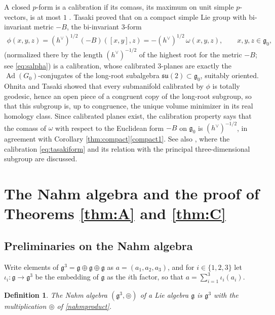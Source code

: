 \documentclass [leqno, 10pt]{amsart}
\newtheorem{definition}[theorem]{Definition}%
\theoremstyle{definition}
\numberwithin{equation}{section}
\newcommand{\tmlt}{\circledcirc}
\newcommand{\om}{\omega}
\newcommand{\su}{\mathfrak{su}}
\newcommand{\g}{\mathfrak{g}}
\newcommand{\Ad}{\operatorname{Ad}}
\newcommand{\gz}{\g_{0}}
\newcommand{\hv}{h^\vee}
\begin{document}
\begin{remark}\label{rem:calibration}
A closed $p$-form is a calibration if its comass, its maximum on unit simple $p$-vectors, is at most $1$ \cite{Harvey-Lawson}. Tasaki \cite[Theorem~5]{Tasaki-calibration} proved that on a compact simple Lie group with bi-invariant metric $-B$, the bi-invariant $3$-form 
\begin{align}\label{eq:tasakiform}
\phi(x, y, z) = (\hv)^{1/2}\,(-B)([x, y], z) = -(\hv)^{1/2}\,\om(x, y, z), \qquad x, y, z \in \gz,
\end{align}
(normalized there by the length $(\hv)^{-1/2}$ of the highest root for the metric $-B$; see \eqref{eq:salpha}) is a calibration, whose calibrated $3$-planes are exactly the $\Ad(G_{0})$-conjugates of the long-root subalgebra $\su(2) \subset \gz$, suitably oriented. Ohnita and Tasaki \cite[Theorem~2 and Lemma~5]{Ohnita-Tasaki} showed that every submanifold calibrated by $\phi$ is totally geodesic, hence an open piece of a congruent copy of the long-root subgroup, so that this subgroup is, up to congruence, the unique volume minimizer in its real homology class. Since calibrated planes exist, the calibration property says that the comass of $\om$ with respect to the Euclidean form $-B$ on $\gz$ is $(\hv)^{-1/2}$, in agreement with Corollary \ref{thm:compact}\ref{compact1}. See also \cite{Hitchin-calibrations}, where the calibration \eqref{eq:tasakiform} and its relation with the principal three-dimensional subgroup are discussed.
\end{remark}

\section{The Nahm algebra and the proof of Theorems \ref{thm:A} and \ref{thm:C}}\label{sec:nahm}
\subsection{Preliminaries on the Nahm algebra}\label{sec:nahmprelim}
Write elements of $\g^{3} = \g \oplus \g \oplus \g$ as $a = (a_{1}, a_{2}, a_{3})$, and for $i \in \{1, 2, 3\}$ let $\iota_{i}:\g \to \g^{3}$ be the embedding of $\g$ as the $i$th factor, so that $a = \sum_{i=1}^{3}\iota_{i}(a_{i})$. 

\begin{definition}\label{def:nahm}
The \emph{Nahm algebra} $(\g^{3}, \tmlt)$ of a Lie algebra $\g$ is $\g^{3}$ with the multiplication $\tmlt$ of \eqref{nahmproduct}.
\end{definition}
\end{document}
